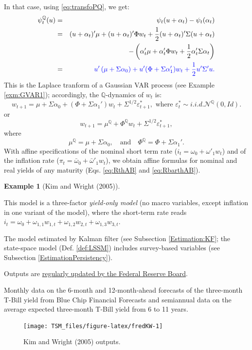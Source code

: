 \documentclass[
  12pt,
]{book}
\theoremstyle{definition}
\theoremstyle{definition}
\newtheorem{example}{Example}[chapter]
\theoremstyle{definition}
\theoremstyle{definition}
\theoremstyle{remark}
\begin{document}
In that case, using \eqref{eq:transfoPQ}, we get:
\begin{eqnarray*}
\psi_t^{\mathbb{Q}}(u) &=& \psi_t(u + \alpha_t) - \psi_t(\alpha_t)\\
&=& (u + \alpha_t)'\mu + (u + \alpha_t)'\Phi w_t + \frac{1}{2}(u + \alpha_t)'\Sigma(u + \alpha_t) \\
&& - \left(\alpha_t'\mu + \alpha_t'\Phi w_t + \frac{1}{2}\alpha_t'\Sigma\alpha_t\right) \\
&=& \color{blue}{u' \left(\mu + \Sigma \alpha_0 \right) + u'(\Phi + \Sigma \alpha_1')w_t  + \frac{1}{2}u'\Sigma'u}.
\end{eqnarray*}
This is the Laplace tranform of a Gaussian VAR process (see Example \ref{exm:GVAR1}); accordingly, the \(\mathbb{Q}\)-dynamics of \(w_t\) is:
\[
w_{t+1} = \mu + \Sigma  \alpha_0 + (\Phi + \Sigma \alpha_1')  w_{t} + \Sigma^{1/2} \varepsilon^*_{t+1}, \mbox{ where } \varepsilon^*_{t} \sim  i.i.d. \mathcal{N}^{\mathbb{Q}}(0,Id).
\]
or
\begin{equation}
w_{t+1} = \mu^{\mathbb{Q}} + \Phi^{\mathbb{Q}} w_{t} + \Sigma^{1/2} \varepsilon^*_{t+1},\label{eq:GaussianQdyn}
\end{equation}
where
\[
\boxed{\mu^{\mathbb{Q}} = \mu + \Sigma  \alpha_0,\quad \mbox{and} \quad\Phi^{\mathbb{Q}}=\Phi + \Sigma \alpha_1'.}
\]
With affine specifications of the nominal short term rate (\(i_{t} = \omega_0 + \omega'_1 w_t\)) and of the inflation rate (\(\pi_{t} = \bar\omega_0 + \bar\omega'_1 w_t\)), we obtain affine formulas for nominal and real yields of any maturity (Eqs. \eqref{eq:RthAB} and \eqref{eq:RbarthAB}).

\begin{example}[Kim and Wright (2005)]
\protect\hypertarget{exm:KimWright}{}\label{exm:KimWright}

This model is a three-factor \emph{yield-only model} (no macro variables, except inflation in one variant of the model), where the short-term rate reads \(i_t = \omega_0 + \omega_{1,1} w_{1,t} +\omega_{1,2} w_{2,t} +\omega_{1,3} w_{3,t}\).

The model estimated by Kalman filter (see Subsection \ref{Estimation:KF}; the state-space model (Def. \ref{def:LSSM}) includes survey-based variables (see Subsection \ref{EstimationPersistency}).

Outputs are \href{https://www.federalreserve.gov/pubs/feds/2005/200533/200533abs.html}{regularly updated by the Federal Reserve Board}.

Monthly data on the 6-month and 12-month-ahead forecasts of the three-month T-Bill yield from Blue Chip Financial Forecasts and semiannual data on the average expected three-month T-Bill yield from 6 to 11 years.

\begin{figure}
\texttt{[image: TSM\_files/figure-latex/fredKW-1]} \caption{Kim and Wright (2005) outputs.}\label{fig:fredKW}
\end{figure}

\end{example}
\end{document}
